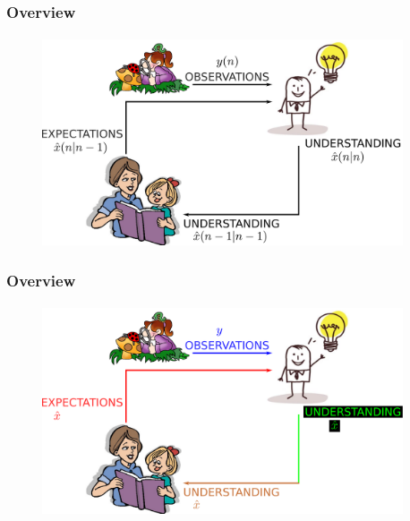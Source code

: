 \begin{frame}\pw\Large
\frametitle{Overview}
\framesubtitle{}
\begin{figure}
\includegraphics[width=0.95\textwidth]{figs/WFAR11_UCP_Update_Prediction_BlockDiagram-2.pdf}
\end{figure}
\end{frame}



\begin{frame}\pw\Large
\frametitle{Overview}
\framesubtitle{}
\begin{figure}
\includegraphics[width=0.95\textwidth]{figs/WFAR11_UCP_Update_Prediction_BlockDiagram-3.pdf}
\end{figure}
\end{frame}



